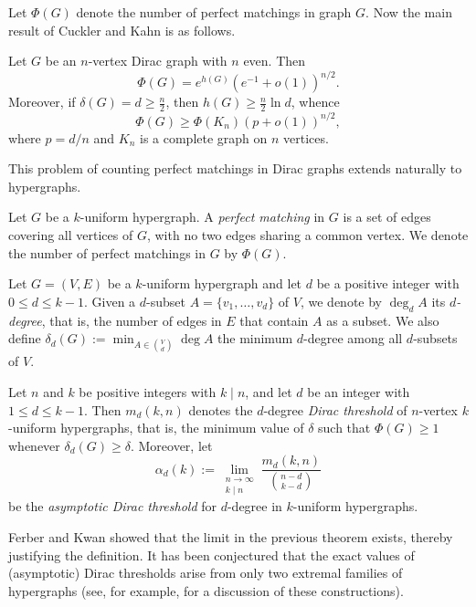 \documentclass[11pt]{article}
\begin{document}
Let $\Phi(G)$ denote the number of perfect matchings in graph $G$. Now the main result of Cuckler and Kahn \cite{cuckler2009entropy,cuckler2009hamiltonian} is as follows.

\begin{theorem}\label{thm-cuckler-kahn}
    Let $G$ be an $n$-vertex Dirac graph with $n$ even. Then
    $$\Phi(G)=e^{h(G)}\left(e^{-1}+o(1)\right)^{n/2}.$$
    Moreover, if $\delta(G)=d\ge\frac{n}{2}$, then $h(G)\ge \frac{n}{2}\ln d$, whence
    $$\Phi(G)\ge \Phi(K_n)(p+o(1))^{n/2},$$
    where $p=d/n$ and $K_n$ is a complete graph on $n$ vertices.
\end{theorem}

This problem of counting perfect matchings in Dirac graphs extends naturally to hypergraphs.

\begin{definition}\label{def-pm}
    Let $G$ be a $k$-uniform hypergraph. A \emph{perfect matching} in $G$ is a set of edges covering all vertices of $G$, with no two edges sharing a common vertex. We denote the number of perfect matchings in $G$ by $\Phi(G)$.
\end{definition}

\begin{definition}\label{def-d-deg}
    Let $G=(V,E)$ be a $k$-uniform hypergraph and let $d$ be a positive integer with $0\le d\le k-1$. Given a $d$-subset $A=\{v_1,\dots,v_d\}$ of $V$, we denote by $\deg_dA$ its \emph{$d$-degree}, that is, the number of edges in $E$ that contain $A$ as a subset. We also define $\delta_d(G):=\min_{A\in\binom{V}{d}}\deg A$ the minimum $d$-degree among all $d$-subsets of $V$.
\end{definition}

\begin{definition}\label{thres-pm}
    Let $n$ and $k$ be positive integers with $k\mid n$, and let $d$ be an integer with $1\le d\le k-1$. Then $m_d(k,n)$ denotes the $d$-degree \emph{Dirac threshold} of $n$-vertex $k$-uniform hypergraphs, that is, the minimum value of $\delta$ such that $\Phi(G)\geq 1$ whenever $\delta_d(G)\ge \delta$. Moreover, let
    $$\alpha_d(k):=\lim_{\substack{n\to\infty\\k\mid n}} \frac{m_d(k,n)}{\binom{n-d}{k-d}}$$
    be the \emph{asymptotic Dirac threshold} for $d$-degree in $k$-uniform hypergraphs.
\end{definition}

Ferber and Kwan \cite{ferber2022dirac} showed that the limit in the previous theorem exists, thereby justifying the definition. It has been conjectured that the exact values of (asymptotic) Dirac thresholds arise from only two extremal families of hypergraphs (see, for example, \cite{alon2012large} for a discussion of these constructions).
\end{document}
